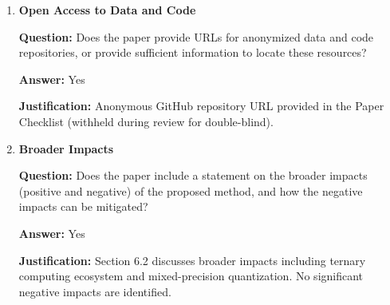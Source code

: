 \documentclass{article}
\begin{document}
\begin{enumerate}
\item \textbf{Open Access to Data and Code}

\textbf{Question:} Does the paper provide URLs for anonymized data and code repositories, or provide sufficient information to locate these resources?

\textbf{Answer:} Yes

\textbf{Justification:} Anonymous GitHub repository URL provided in the Paper Checklist (withheld during review for double-blind).

\item \textbf{Broader Impacts}

\textbf{Question:} Does the paper include a statement on the broader impacts (positive and negative) of the proposed method, and how the negative impacts can be mitigated?

\textbf{Answer:} Yes

\textbf{Justification:} Section 6.2 discusses broader impacts including ternary computing ecosystem and mixed-precision quantization. No significant negative impacts are identified.
\end{enumerate}
\end{document}
